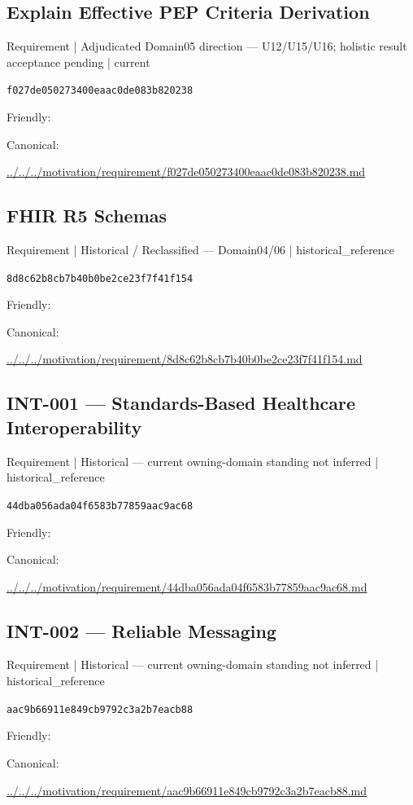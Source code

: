 \documentclass[10pt,a4paper]{article}
\begin{document}
\subsection*{Explain Effective PEP Criteria Derivation}
{\small Requirement | Adjudicated Domain05 direction — U12/U15/U16; holistic result acceptance pending | current}\par
\texttt{f027de050273400eaac0de083b820238}\par
Friendly: \par
Canonical: \par
{\footnotesize\url{../../../motivation/requirement/f027de050273400eaac0de083b820238.md}}\par
\subsection*{FHIR R5 Schemas}
{\small Requirement | Historical / Reclassified — Domain04/06 | historical\_reference}\par
\texttt{8d8c62b8cb7b40b0be2ce23f7f41f154}\par
Friendly: \par
Canonical: \par
{\footnotesize\url{../../../motivation/requirement/8d8c62b8cb7b40b0be2ce23f7f41f154.md}}\par
\subsection*{INT-001 — Standards-Based Healthcare Interoperability}
{\small Requirement | Historical — current owning-domain standing not inferred | historical\_reference}\par
\texttt{44dba056ada04f6583b77859aac9ac68}\par
Friendly: \par
Canonical: \par
{\footnotesize\url{../../../motivation/requirement/44dba056ada04f6583b77859aac9ac68.md}}\par
\subsection*{INT-002 — Reliable Messaging}
{\small Requirement | Historical — current owning-domain standing not inferred | historical\_reference}\par
\texttt{aac9b66911e849cb9792c3a2b7eacb88}\par
Friendly: \par
Canonical: \par
{\footnotesize\url{../../../motivation/requirement/aac9b66911e849cb9792c3a2b7eacb88.md}}\par
\end{document}
